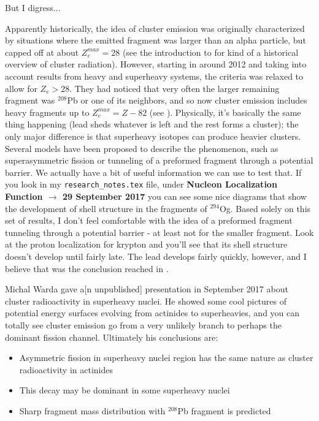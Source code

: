 But I digress...

Apparently historically, the idea of cluster emission was originally characterized by situations where the emitted fragment was larger than an alpha particle, but capped off at about $Z_e^{max}=28$ (see the introduction to \cite{Warda2011} for kind of a historical overview of cluster radiation). However, starting in around 2012 and taking into account results from heavy and superheavy systems, the criteria was relaxed to allow for $Z_e>28$. They had noticed that very often the larger remaining fragment was $^{208}$Pb or one of its neighbors, and so now cluster emission includes heavy fragments up to $Z_e^{max}=Z-82$ (see \cite{Poenaru2012}). Physically, it's basically the same thing happening (lead sheds whatever is left and the rest forms a cluster); the only major difference is that superheavy isotopes can produce heavier clusters. Several models have been proposed to describe the phenomenon, such as superasymmetric fission or tunneling of a preformed fragment through a potential barrier. We actually have a bit of useful information we can use to test that. If you look in my \texttt{research\_notes.tex} file, under \textbf{Nucleon Localization Function $\rightarrow$ 29 September 2017} you can see some nice diagrams that show the development of shell structure in the fragments of $^{294}$Og. Based solely on this set of results, I don't feel comfortable with the idea of a preformed fragment tunneling through a potential barrier - at least not for the smaller fragment. Look at the proton localization for krypton and you'll see that its shell structure doesn't develop until fairly late. The lead develops fairly quickly, however, and I believe that was the conclusion reached in \cite{Warda2011}.

Michal Warda gave a[n unpublished] presentation in September 2017 about cluster radioactivity in superheavy nuclei. He showed some cool pictures of potential energy surfaces evolving from actinides to superheavies, and you can totally see cluster emission go from a very unlikely branch to perhaps the dominant fission channel. Ultimately his conclusions are:

\begin{itemize}
\item Asymmetric fission in superheavy nuclei region has the same nature as cluster radioactivity in actinides
\item This decay may be dominant in some superheavy nuclei
\item Sharp fragment mass distribution with $^{208}$Pb fragment is predicted
\end{itemize}

